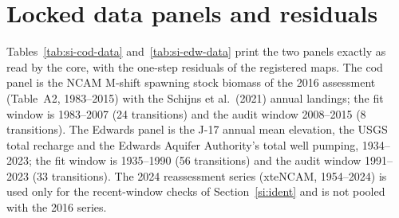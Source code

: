 \section{Locked data panels and residuals}\label{si:data}
Tables~\ref{tab:si-cod-data} and~\ref{tab:si-edw-data} print the two panels exactly as read by the core, with the one-step residuals of the registered maps. The cod panel is the NCAM M-shift spawning stock biomass of the 2016 assessment (Table~A2, 1983--2015) with the Schijns et al.\ (2021) annual landings; the fit window is 1983--2007 (24 transitions) and the audit window 2008--2015 (8 transitions). The Edwards panel is the J-17 annual mean elevation, the USGS total recharge and the Edwards Aquifer Authority's total well pumping, 1934--2023; the fit window is 1935--1990 (56 transitions) and the audit window 1991--2023 (33 transitions). The 2024 reassessment series (xteNCAM, 1954--2024) is used only for the recent-window checks of Section~\ref{si:ident} and is not pooled with the 2016 series.


